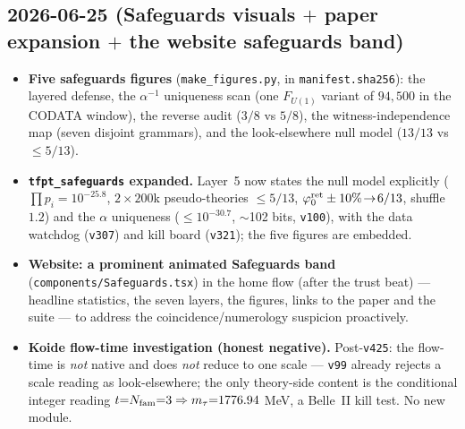 \documentclass[11pt]{article}
\providecommand{\vref}[1]{\texttt{#1}}
\begin{document}
\subsection*{2026-06-25 (Safeguards visuals $+$ paper expansion $+$ the website safeguards band)}
\begin{itemize}
\item \textbf{Five safeguards figures} (\texttt{make\_figures.py}, in \texttt{manifest.sha256}): the
layered defense, the $\alpha^{-1}$ uniqueness scan (one $F_{U(1)}$ variant of $94{,}500$ in the CODATA
window), the reverse audit ($3/8$ vs $5/8$), the witness-independence map (seven disjoint grammars), and the
look-elsewhere null model ($13/13$ vs $\le5/13$).
\item \textbf{\texttt{tfpt\_safeguards} expanded.} Layer~5 now states the null model explicitly
($\prod p_i{=}10^{-25.8}$, $2{\times}200$k pseudo-theories $\le5/13$, $\varphi_0^{\mathrm{ret}}\pm10\%\!\to\!6/13$, shuffle
$1.2$) and the $\alpha$ uniqueness ($\le10^{-30.7}$, $\sim$102 bits, \vref{v100}), with the data watchdog
(\vref{v307}) and kill board (\vref{v321}); the five figures are embedded.
\item \textbf{Website: a prominent animated Safeguards band} (\texttt{components/Safeguards.tsx}) in the
home flow (after the trust beat) --- headline statistics, the seven layers, the figures, links to the paper
and the suite --- to address the coincidence/numerology suspicion proactively.
\item \textbf{Koide flow-time investigation (honest negative).} Post-\texttt{v425}: the flow-time is
\emph{not} native and does \emph{not} reduce to one scale --- \vref{v99} already rejects a scale reading as
look-elsewhere; the only theory-side content is the conditional integer reading $t{=}N_{\mathrm{fam}}{=}3\Rightarrow
m_\tau{=}1776.94$ MeV, a Belle~II kill test. No new module.
\end{itemize}
\end{document}
